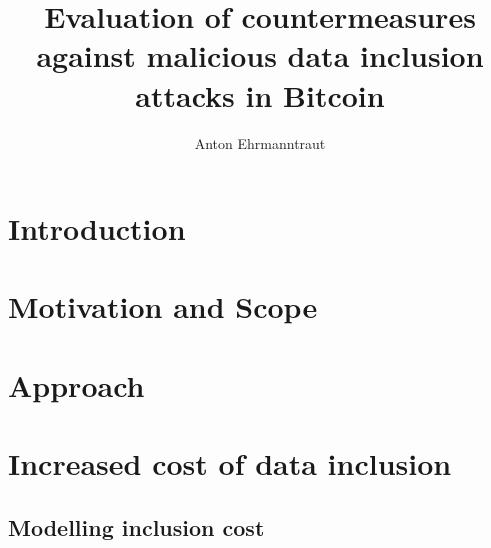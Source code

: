 \documentclass[10pt,a4paper,twocolumn]{article}
\title{Evaluation of countermeasures against malicious data inclusion attacks in Bitcoin}
\author{Anton Ehrmanntraut}
\renewenvironment{abstract}
{\begin{quote}
\noindent {\bfseries \abstractname.}}
{\end{quote}
}
\begin{document}
\raggedbottom
\maketitle
\begin{abstract}
\end{abstract}

\section{Introduction}

\section{Motivation and Scope}



\section{Approach}

\section{Increased cost of data inclusion}


\subsection{Modelling inclusion cost}
\end{document}
